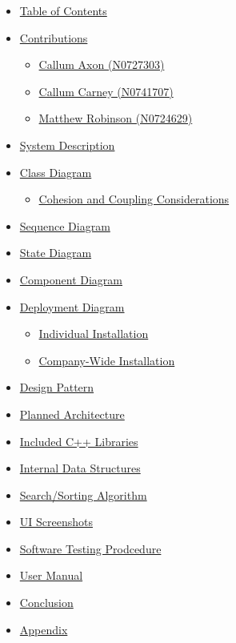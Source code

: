 \documentclass[
  english,
  a4paper,
,tablecaptionabove
]{scrartcl}
\providecommand{\tightlist}{%
  \setlength{\itemsep}{0pt}\setlength{\parskip}{0pt}}
\begin{document}
\begin{itemize}
\tightlist
\item
  \protect\hyperlink{table-of-contents}{Table of Contents}
\item
  \protect\hyperlink{contributions}{Contributions}

  \begin{itemize}
  \tightlist
  \item
    \protect\hyperlink{callum-axon-n0727303}{Callum Axon (N0727303)}
  \item
    \protect\hyperlink{callum-carney-n0741707}{Callum Carney (N0741707)}
  \item
    \protect\hyperlink{matthew-robinson-n0724629}{Matthew Robinson
    (N0724629)}
  \end{itemize}
\item
  \protect\hyperlink{system-description}{System Description}
\item
  \protect\hyperlink{class-diagram}{Class Diagram}

  \begin{itemize}
  \tightlist
  \item
    \protect\hyperlink{cohesion-and-coupling-considerations}{Cohesion
    and Coupling Considerations}
  \end{itemize}
\item
  \protect\hyperlink{sequence-diagram}{Sequence Diagram}
\item
  \protect\hyperlink{state-diagram}{State Diagram}
\item
  \protect\hyperlink{component-diagram}{Component Diagram}
\item
  \protect\hyperlink{deployment-diagram}{Deployment Diagram}

  \begin{itemize}
  \tightlist
  \item
    \protect\hyperlink{individual-installation}{Individual Installation}
  \item
    \protect\hyperlink{company-wide-installation}{Company-Wide
    Installation}
  \end{itemize}
\item
  \protect\hyperlink{design-pattern}{Design Pattern}
\item
  \protect\hyperlink{planned-architecture}{Planned Architecture}
\item
  \protect\hyperlink{included-c-libraries}{Included C++ Libraries}
\item
  \protect\hyperlink{internal-data-structures}{Internal Data Structures}
\item
  \protect\hyperlink{searchsorting-algorithm}{Search/Sorting Algorithm}
\item
  \protect\hyperlink{ui-screenshots}{UI Screenshots}
\item
  \protect\hyperlink{software-testing-prodcedure}{Software Testing
  Prodcedure}
\item
  \protect\hyperlink{user-manual}{User Manual}
\item
  \protect\hyperlink{conclusion}{Conclusion}
\item
  \protect\hyperlink{appendix}{Appendix}
\end{itemize}
\end{document}
